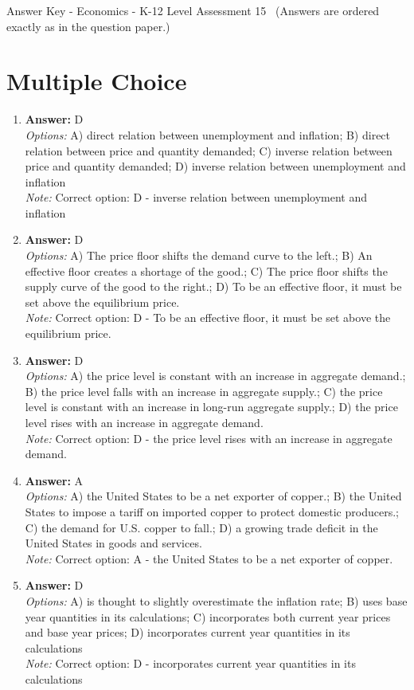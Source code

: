 \documentclass[12pt]{article}
\begin{document}
\begin{center}
Answer Key - Economics - K-12 Level Assessment 15 \
\small (Answers are ordered exactly as in the question paper.)
\end{center}

\section*{Multiple Choice}
\begin{enumerate}[label=\arabic*.]
\item \textbf{Answer:} D
\\ \textit{Options:} A) direct relation between unemployment and inflation; B) direct relation between price and quantity demanded; C) inverse relation between price and quantity demanded; D) inverse relation between unemployment and inflation
\\ \textit{Note:} Correct option: D - inverse relation between unemployment and inflation
\item \textbf{Answer:} D
\\ \textit{Options:} A) The price floor shifts the demand curve to the left.; B) An effective floor creates a shortage of the good.; C) The price floor shifts the supply curve of the good to the right.; D) To be an effective floor, it must be set above the equilibrium price.
\\ \textit{Note:} Correct option: D - To be an effective floor, it must be set above the equilibrium price.
\item \textbf{Answer:} D
\\ \textit{Options:} A) the price level is constant with an increase in aggregate demand.; B) the price level falls with an increase in aggregate supply.; C) the price level is constant with an increase in long-run aggregate supply.; D) the price level rises with an increase in aggregate demand.
\\ \textit{Note:} Correct option: D - the price level rises with an increase in aggregate demand.
\item \textbf{Answer:} A
\\ \textit{Options:} A) the United States to be a net exporter of copper.; B) the United States to impose a tariff on imported copper to protect domestic producers.; C) the demand for U.S. copper to fall.; D) a growing trade deficit in the United States in goods and services.
\\ \textit{Note:} Correct option: A - the United States to be a net exporter of copper.
\item \textbf{Answer:} D
\\ \textit{Options:} A) is thought to slightly overestimate the inflation rate; B) uses base year quantities in its calculations; C) incorporates both current year prices and base year prices; D) incorporates current year quantities in its calculations
\\ \textit{Note:} Correct option: D - incorporates current year quantities in its calculations
\end{enumerate}
\end{document}

